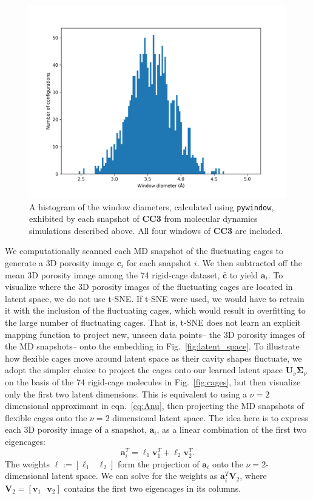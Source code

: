 \documentclass[journal=jacsat,manuscript=article]{achemso}
\begin{document}
{\begin{figure}
\centering
	\includegraphics[width=0.65\columnwidth]{../cc3_histogram.png}
	\caption{\color{red}A histogram of the window diameters, calculated using \texttt{pywindow}, exhibited by each snapshot of \textbf{CC3} from molecular dynamics simulations described above. All four windows of \textbf{CC3} are included.
	} \label{fig:window_diameter_hist}
\end{figure}

We computationally scanned each MD snapshot of the fluctuating cages to generate a 3D porosity image $\mathbf{c}_i$ for each snapshot $i$. We then subtracted off the mean 3D porosity image among the 74 rigid-cage dataset, $\bar{\mathbf{c}}$ to yield $\mathbf{a}_i$.
To visualize where the 3D porosity images of the fluctuating cages are located in latent space, we do not use t-SNE. If t-SNE were used, we would have to retrain it with the inclusion of the fluctuating cages, which would result in overfitting to the large number of fluctuating cages. That is, t-SNE does not learn an explicit mapping function to project new, unseen data points-- the 3D porosity images of the MD snapshots-- onto the embedding in Fig.~\ref{fig:latent_space}. To illustrate how flexible cages move around latent space as their cavity shapes fluctuate, we adopt the simpler choice to project the cages onto our learned latent space $\mathbf{U}_\nu \mathbf{\Sigma}_\nu$ on the basis of the 74 rigid-cage molecules in Fig.~\ref{fig:cages}, but then visualize only the first two latent dimensions. This is equivalent to using a $\nu=2$ dimensional approximant in eqn.~\ref{eq:Anu}, then projecting the MD snapshots of flexible cages onto the $\nu=2$ dimensional latent space. 
The idea here is to express each 3D porosity image of a snapshot, $\mathbf{a}_i$, as a linear combination of the first two eigencages:
\begin{equation}
\mathbf{a}_i^T = \ell_1 \mathbf{v}_1^T + \ell_2 \mathbf{v}_2^T.
\end{equation} The weights $\boldsymbol \ell:=[\ell_1 \text{ } \ell_2]$ form the projection of $\mathbf{a}_i$ onto the $\nu=2$-dimensional latent space. We can solve for the weights as $\mathbf{a}_i^T \mathbf{V}_2$, where $\mathbf{V}_2 = [\mathbf{v}_1 \text{ } \mathbf{v}_2]$ contains the first two eigencages in its columns.

}
\end{document}
